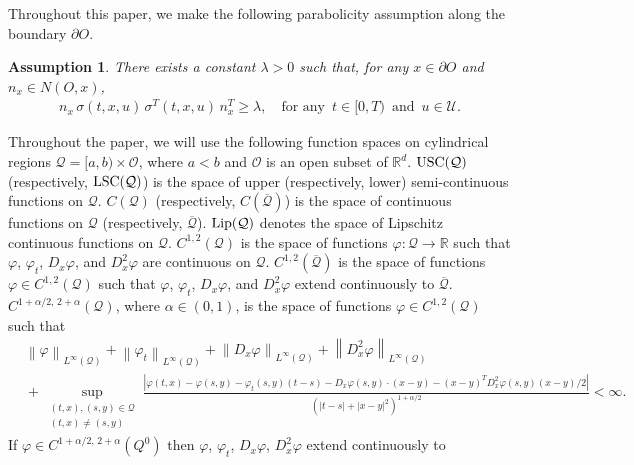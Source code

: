 \documentclass[amscd,amssymb,11pt]{article}
\newtheorem{assumption}[theorem]{Assumption}
\numberwithin{theorem}{section}
\numberwithin{equation}{section}
\begin{document}
Throughout this paper, we make the following parabolicity assumption along the boundary $\partial O$.
\begin{assumption}\label{assump:ellpiticity along boundary}
There exists a constant $\lambda>0$ such that, for any $x\in\partial O$ and $n_{x}\in N(O,x)$,
\begin{align*}
n_{x}\,\sigma(t,x,u)\,\sigma^{T}(t,x,u)\,n_{x}^{T}\geq\lambda,\quad\text{for any }\,t\in [0,T)\,\,\,\text{and}\,\,\,u\in\mathcal{U}.
\end{align*}
\end{assumption}

Throughout the paper, we will use the following function spaces on cylindrical regions $\mathcal Q=[a,b)\times\mathcal{O}$, where $a<b$ and $\mathcal{O}$ is an open subset of $\mathbb{R}^{d}$. ${\rm USC}(\mathcal{Q})$ (respectively, ${\rm LSC}(\mathcal{Q})$) is the space of upper (respectively, lower) semi-continuous functions on $\mathcal{Q}$. $C(\mathcal{Q})$ (respectively, $C(\overline{\mathcal{Q}})$) is the space of continuous functions on $\mathcal{Q}$ (respectively, $\overline{\mathcal{Q}}$). ${\rm Lip}(\mathcal{Q})$ denotes the space of Lipschitz continuous functions on $\mathcal{Q}$. $C^{1,2}(\mathcal{Q})$ is the space of functions $\varphi:\mathcal{Q}\rightarrow\mathbb{R}$ such that $\varphi$, $\varphi_{t}$, $D_{x}\varphi$, and $D_{x}^{2}\varphi$ are continuous on $\mathcal{Q}$. $C^{1,2}(\overline{\mathcal{Q}})$ is the space of functions $\varphi\in C^{1,2}(\mathcal{Q})$ such that $\varphi$, $\varphi_{t}$, $D_{x}\varphi$, and $D_{x}^{2}\varphi$ extend continuously to $\overline{\mathcal{Q}}$. $C^{1+\alpha/2,\,2+\alpha}(\mathcal{Q})$, where $\alpha\in(0,1)$, is the space of functions $\varphi\in C^{1,2}(\mathcal{Q})$ such that
\begin{align}\label{c2alpha}
&\left\|\varphi\right\|_{L^\infty(\mathcal{Q})}+\left\|\varphi_{t}\right\|_{L^\infty(\mathcal{Q})}+\left\|D_{x}\varphi\right\|_{L^\infty(\mathcal{Q})}+\left\|D_{x}^{2}\varphi\right\|_{L^\infty(\mathcal{Q})}\\
&\!+\!\sup_{\substack{(t,x),(s,y)\in\mathcal{Q} \\ (t,x)\neq(s,y)}}\!\!\frac{\left|\varphi(t,x)\!-\!\varphi(s,y)\!-\!\varphi_{t}(s,y)(t\!-\!s)\!-\!D_{x}\varphi(s,y)\!\cdot\!(x\!-\!y)\!-\!(x\!-\!y)^{T}\!D_{x}^{2}\varphi(s,y)(x\!-\!y)/2\right|}{\left(|t-s|+|x-y|^{2}\right)^{1+\alpha/2}}<\infty.
\nonumber
\end{align}
If $\varphi\in C^{1+\alpha/2,\,2+\alpha}(Q^0)$ then $\varphi$, $\varphi_{t}$, $D_{x}\varphi$, $D_{x}^{2}\varphi$ extend continuously to 
\end{document}
